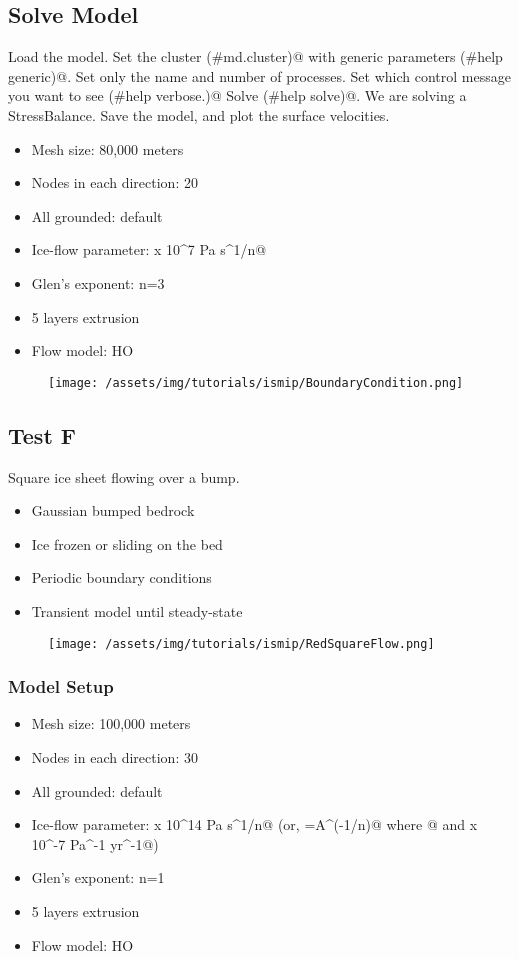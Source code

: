 \subsection{Solve Model} %
Load the \verb@BoundaryConditions@ model. Set the cluster \verb@(#md.cluster)@ with generic parameters \verb@(#help generic)@. Set only the name and number of processes. Set which control message you want to see \verb@(#help verbose.)@ Solve \verb@(#help solve)@. We are solving a StressBalance. Save the model, and plot the surface velocities.
\begin{itemize}
	\item Mesh size: 80,000 meters
	\item Nodes in each direction: 20
	\item All grounded: default
	\item Ice-flow parameter:  x 10^7 Pa s^1/n@
	\item Glen's exponent: n=3
	\item 5 layers extrusion
	\item Flow model: HO
\end{itemize}
\begin{figure}[H]
	\begin{center}
		\texttt{[image: /assets/img/tutorials/ismip/BoundaryCondition.png]}
	\end{center}
\end{figure}
\subsection{Test F} %
Square ice sheet flowing over a bump.
\begin{itemize}
	\item Gaussian bumped bedrock
	\item Ice frozen or sliding on the bed
	\item Periodic boundary conditions
	\item Transient model until steady-state
\end{itemize}
\begin{figure}[H]
	\begin{center}
		\texttt{[image: /assets/img/tutorials/ismip/RedSquareFlow.png]}
	\end{center}
\end{figure}
\subsubsection{Model Setup}
\begin{itemize}
	\item Mesh size: 100,000 meters
	\item Nodes in each direction: 30
	\item All grounded: default
	\item Ice-flow parameter:  x 10^14 Pa s^1/n@ (or, \verb@B=A^(-1/n)@ where @ and  x 10^-7 Pa^-1 yr^-1@)
	\item Glen's exponent: n=1
	\item 5 layers extrusion
	\item Flow model: HO
\end{itemize}
